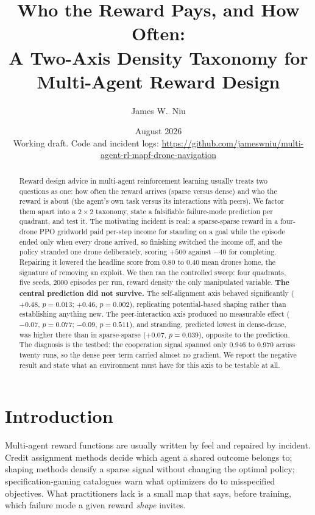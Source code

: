 \documentclass[11pt]{article}
\title{Who the Reward Pays, and How Often:\\A Two-Axis Density Taxonomy for Multi-Agent Reward Design}
\author{James W.\ Niu}
\date{August 2026 \\ \small Working draft. Code and incident logs: \url{https://github.com/jameswniu/multi-agent-rl-mapf-drone-navigation}}
\begin{document}
\maketitle

\begin{abstract}
Reward design advice in multi-agent reinforcement learning usually treats two questions as one: how often the reward arrives (sparse versus dense) and who the reward is about (the agent's own task versus its interactions with peers). We factor them apart into a $2{\times}2$ taxonomy, state a falsifiable failure-mode prediction per quadrant, and test it. The motivating incident is real: a sparse-sparse reward in a four-drone PPO gridworld paid per-step income for standing on a goal while the episode ended only when every drone arrived, so finishing switched the income off, and the policy stranded one drone deliberately, scoring $+500$ against $-40$ for completing. Repairing it lowered the headline score from 0.80 to 0.40 mean drones home, the signature of removing an exploit. We then ran the controlled sweep: four quadrants, five seeds, 2000 episodes per run, reward density the only manipulated variable. \textbf{The central prediction did not survive.} The self-alignment axis behaved significantly ($+0.48$, $p=0.013$; $+0.46$, $p=0.002$), replicating potential-based shaping rather than establishing anything new. The peer-interaction axis produced no measurable effect ($-0.07$, $p=0.077$; $-0.09$, $p=0.511$), and stranding, predicted lowest in dense-dense, was higher there than in sparse-sparse ($+0.07$, $p=0.039$), opposite to the prediction. The diagnosis is the testbed: the cooperation signal spanned only 0.946 to 0.970 across twenty runs, so the dense peer term carried almost no gradient. We report the negative result and state what an environment must have for this axis to be testable at all.
\end{abstract}

\section{Introduction}
Multi-agent reward functions are usually written by feel and repaired by incident. Credit assignment methods decide which agent a shared outcome belongs to; shaping methods densify a sparse signal without changing the optimal policy; specification-gaming catalogues warn what optimizers do to misspecified objectives. What practitioners lack is a small map that says, before training, which failure mode a given reward \emph{shape} invites.
\end{document}
